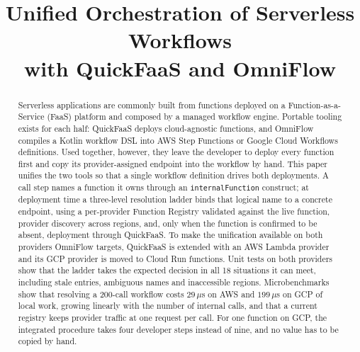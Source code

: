\documentclass[conference]{IEEEtran}
\begin{document}
\title{Unified Orchestration of Serverless Workflows\\with QuickFaaS and OmniFlow}

\author{
\and
{}
\and
{}
}

\maketitle

\begin{abstract}
Serverless applications are commonly built from functions deployed on a Function-as-a-Service
(FaaS) platform and composed by a managed workflow engine. Portable tooling exists for each half:
QuickFaaS deploys cloud-agnostic functions, and OmniFlow compiles a Kotlin workflow DSL into AWS
Step Functions or Google Cloud Workflows definitions. Used together, however, they leave the
developer to deploy every function first and copy its provider-assigned endpoint into the workflow
by hand. This paper unifies the two tools so that a single workflow definition drives both
deployments. A call step names a function it owns through an \texttt{internalFunction} construct;
at deployment time a three-level resolution ladder binds that logical name to a concrete endpoint,
using a per-provider Function Registry validated against the live function, provider discovery
across regions, and, only when the function is confirmed to be absent, deployment through
QuickFaaS. To make the unification available on both providers OmniFlow targets, QuickFaaS is
extended with an AWS Lambda provider and its GCP provider is moved to Cloud Run functions. Unit
tests on both providers show that the ladder takes the expected decision in all 18 situations it
can meet, including stale entries, ambiguous names and inaccessible regions. Microbenchmarks show
that resolving a 200-call workflow costs $29\,\mu$s on AWS and $199\,\mu$s on GCP of local work,
growing linearly with the number of internal calls, and that a current registry keeps provider
traffic at one request per call. For one function on GCP, the integrated procedure takes four
developer steps instead of nine, and no value has to be copied by hand.
\end{abstract}
\end{document}
